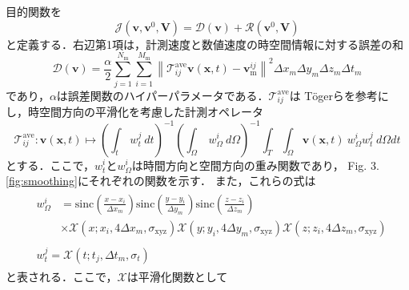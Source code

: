 目的関数を
\begin{equation}
    \label{eq:cost_function_unsteady}
    \mathcal{J}(\mathbf{v}, \mathbf{v}^{0}, \mathbf{V}) 
    = \mathcal{D}(\mathbf{v}) + \mathcal{R}(\mathbf{v}^{0}, \mathbf{V})
\end{equation}
と定義する．右辺第1項は，計測速度と数値速度の時空間情報に対する誤差の和
\begin{equation}
    \label{eq:error_function_unsteady}
    \mathcal{D}(\mathbf{v}) = 
    \frac{\alpha}{2} \sum_{j=1}^{N_\text{m}} \sum_{i=1}^{M_\text{m}} 
    \left\|\mathcal{T}^{\text{ave}}_{ij} \mathbf{v}(\mathbf{x},t) 
    - \mathbf{v}_\text{m}^{ij}\right\|^2 \Delta x_m \Delta y_m \Delta z_m \Delta t_m
\end{equation}
であり，$\alpha$は誤差関数のハイパーパラメータである．$\mathcal{T}^{\text{ave}}_{ij}$は
Tögerら\cite{Toger2020}を参考にし，時空間方向の平滑化を考慮した計測オペレータ
\begin{equation}
    \label{eq:operator_average_unsteady}
    \mathcal{T}^{\text{ave}}_{ij}  : \mathbf{v}(\mathbf{x},t) 
    \mapsto \left(\int_{t} \ w^{j}_{t} \ dt\right)^{-1}
    \left(\int_{\Omega} \ w^{i}_{\Omega} \ d \Omega\right)^{-1} 
    \int_{T} \int_{\Omega} \mathbf{v}(\mathbf{x},t) \ w^{i}_{\Omega} w^{j}_{t} \ d \Omega dt
\end{equation}
とする．ここで，$w^{i}_{t}$と$w^{i}_{\Omega}$は時間方向と空間方向の重み関数であり，
Fig. 3.\ref{fig:smoothing}にそれぞれの関数を示す．
また，これらの式は
\begin{align}
    & \begin{aligned}
        w^{i}_{\Omega}
        & = \text{sinc}\left(\frac{x-x_i}{\Delta x_{m}}\right) \text{sinc}\left(\frac{y-y_i}{\Delta y_{m}}\right) \text{sinc}\left(\frac{z-z_i}{\Delta z_{m}}\right) \\
        & \times \mathcal{X}\left(x;x_{i},4\Delta x_{m}, \sigma_{\mathrm{xyz}}\right)\mathcal{X}\left(y;y_{i},4\Delta y_{m}, \sigma_{\mathrm{xyz}}\right)\mathcal{X}\left(z;z_{i},4\Delta z_{m}, \sigma_{\mathrm{xyz}}\right) 
        \label{eq:operator_weight_space_unsteady}
    \end{aligned} \\[5pt]
    & \begin{aligned}
        w^{j}_{t}
        = \mathcal{X}\left(t;t_{j}, \Delta t_{m}, \sigma_{t}\right)
        \label{eq:operator_weight_time_unsteady}
    \end{aligned}
\end{align}
と表される．ここで，$\mathcal{X}$は平滑化関数として
